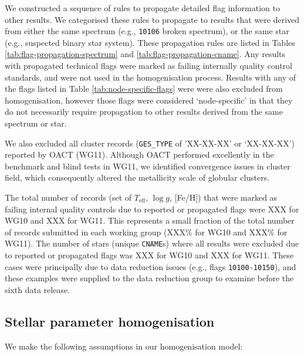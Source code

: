 \documentclass[preprint]{aastex}
\newcommand{\teff}{T_{\mathrm{eff}}}
\newcommand{\logg}{\log g}
\begin{document}
We constructed a sequence of rules to propagate detailed flag information to other results.
We categorised these rules to propagate to results that were derived from either the same 
spectrum (e.g., \texttt{10106} broken spectrum), or the same star (e.g., suspected binary 
star system).  These propagation rules are listed in Tables \ref{tab:flag-propagation-spectrum}
and \ref{tab:flag-propagation-cname}. Any results with propagated technical flags were 
marked as failing internally quality control standards, and were not used in the homogenisation
process.  Results with any of the flags listed in Table \ref{tab:node-specific-flags} were
were also excluded from homogenisation, however those flags were considered `node-specific'
in that they do not necessarily require propagation to other results derived from the same
spectrum or star.


We also excluded all cluster records (\texttt{GES\_TYPE} of 'XX-XX-XX' or `XX-XX-XX') 
reported by OACT (WG11).  Although OACT performed excellently in the benchmark and blind tests
in WG11, we identified convergence issues in cluster field, which consequently altered the
metallicity scale of globular clusters.


The total number of records (set of $\teff$, $\logg$, [Fe/H]) that were marked as failing
internal quality controls due to reported or propagated flags were XXX for WG10 and XXX for
WG11.  This represents a small fraction of the total number of records submitted in each
working group (XXX\% for WG10 and XXX\% for WG11).  The number of stars (unique \texttt{CNAME}s) where all results were excluded due to reported or propagated flags was XXX for WG10 and XXX for WG11.  These cases were principally due to data reduction issues (e.g., flags 
\texttt{10100-10150}), and these examples were supplied to the data reduction group to
examine before the sixth data release.



\subsection{Stellar parameter homogenisation}
\label{sec:stellar-parameter-homogenisation}


\noindent{}We make the following assumptions in our homogenisation model:
\end{document}
